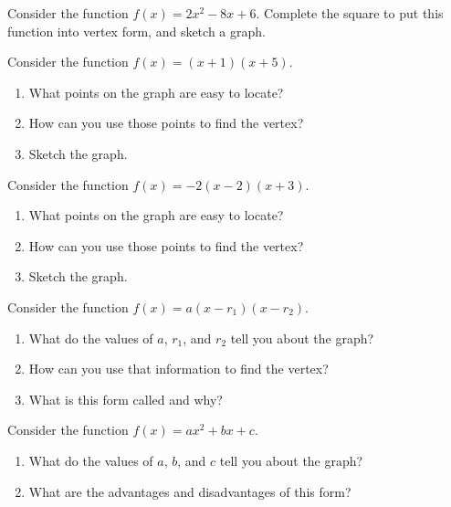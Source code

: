 \vfill

\begin{prob}
Consider the function $f(x) = 2x^2 - 8x + 6$. Complete the square to
put this function into vertex form, and sketch a graph.
\end{prob}

\vfill
\newpage

\begin{prob}
Consider the function $f(x) = (x+1)(x+5)$.  
\begin{enumerate}
\item What points on the graph are easy to locate?  
\item How can you use those points to find the vertex? 
\item Sketch the graph. 
\end{enumerate}
\end{prob}


\begin{prob}
Consider the function $f(x) = -2(x-2)(x+3)$.  
\begin{enumerate}
\item What points on the graph are easy to locate?  
\item How can you use those points to find the vertex? 
\item Sketch the graph. 
\end{enumerate}
\end{prob}

\begin{prob}
Consider the function $f(x) = a(x-r_1)(x-r_2)$.  
\begin{enumerate}
\item What do the values of $a$, $r_1$, and $r_2$ tell you about the graph?  
\item How can you use that information to find the vertex? 
\item What is this form called and why?  
\end{enumerate}
\end{prob}

\begin{prob}
Consider the function $f(x) = ax^2+bx+c$.  
\begin{enumerate}
\item What do the values of $a$, $b$, and $c$ tell you about the graph?  
\item What are the advantages and disadvantages of this form?  
\end{enumerate}
\end{prob}


